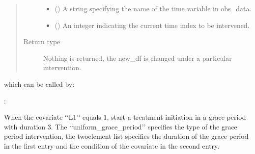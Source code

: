 \documentclass[letterpaper,10pt,english]{sphinxmanual}
\begin{document}
\begin{fulllineitems}
\begin{quote}
\begin{description}
\begin{itemize}
\item {} 
\sphinxAtStartPar
{} () \textendash{} A string specifying the name of the time variable in obs\_data.

\item {} 
\sphinxAtStartPar
{} () \textendash{} An integer indicating the current time index to be intervened.

\end{itemize}

\item[{Return type}] \leavevmode
\sphinxAtStartPar
Nothing is returned, the new\_df is changed under a particular intervention.

\end{description}\end{quote}

\end{fulllineitems}


\sphinxAtStartPar
which can be called by:

\begin{sphinxVerbatim}[commandchars=\\\{\}]
   
\end{sphinxVerbatim}

\sphinxAtStartPar
{}:

\sphinxAtStartPar
When the covariate ‘‘L1’’ equals 1, start a treatment initiation in a grace period with duration 3. The ‘‘uniform\_grace\_period’’
specifies the type of the grace period intervention, the two\sphinxhyphen{}element list specifies the duration of the grace period
in the first entry and the condition of the covariate in the second entry.
\end{document}
